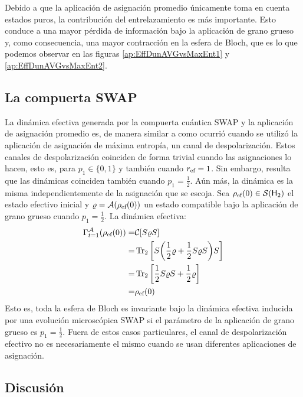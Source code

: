 Debido a que la aplicación de asignación promedio únicamente toma en cuenta estados puros, la contribución del entrelazamiento es más importante. Esto conduce a una mayor pérdida de información bajo la aplicación de grano grueso y, como consecuencia, una mayor contracción en la esfera de Bloch, que es lo que podemos observar en las figuras \ref{ap:EffDunAVGvsMaxEnt1} y \ref{ap:EffDunAVGvsMaxEnt2}.

\subsection{La compuerta SWAP}

La dinámica efectiva generada por la compuerta cuántica SWAP y la aplicación de asignación promedio es, de manera similar a como ocurrió cuando se utilizó la aplicación de asignación de máxima entropía, un canal de despolarización. Estos canales de despolarización coinciden de forma trivial cuando las asignaciones lo hacen, esto es, para $p_{1}\in\{0,1\}$ y también cuando $r_{\text{ef}}=1$. Sin embargo, resulta que las dinámicas coinciden también cuando $p_{1}=\frac{1}{2}$. Aún más, la dinámica es la misma independientemente de la asignación que se escoja. Sea $\rho_{\text{ef}}(0)\in\mathcal{S}({\sf H}_{2})$ el estado efectivo inicial y $\varrho=\mathcal{A}(\rho_{\text{ef}}(0))$ un estado compatible bajo la aplicación de grano grueso cuando $p_{1}=\frac{1}{2}$. La dinámica efectiva:
\begin{align}
  \Gamma_{t=1}^{\mathcal{A}}(\rho_{\text{ef}}(0))=&\mathcal{C}\qty[S\varrho S]\nonumber\\
  =&\Tr_{2}\qty[S\qty(\frac{1}{2}\varrho+\frac{1}{2}S\varrho S)S]\nonumber\\
  =&\Tr_{2}\qty[\frac{1}{2}S\varrho S+\frac{1}{2}\varrho ]\nonumber\\
  =&\rho_{\text{ef}}(0)\nonumber
\end{align}
Esto es, toda la esfera de Bloch es invariante bajo la dinámica efectiva inducida por una evolución microscópica SWAP si el parámetro de la aplicación de grano grueso es $p_{1}=\frac{1}{2}$. Fuera de estos casos particulares, el canal de despolarización efectivo no es necesariamente el mismo cuando se usan diferentes aplicaciones de asignación.

\subsection{Discusión}

